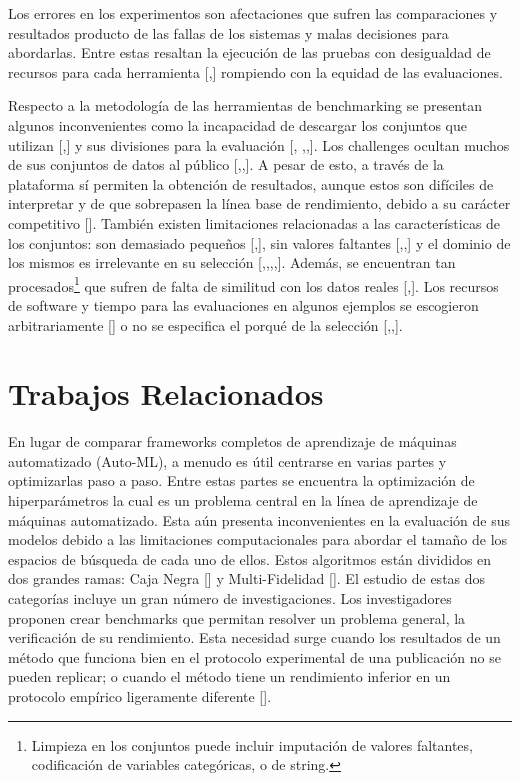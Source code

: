 Los errores en los experimentos son afectaciones que sufren las comparaciones y resultados producto de las fallas de los sistemas y malas decisiones para abordarlas. 
Entre estas resaltan la ejecución de las pruebas con desigualdad de recursos para cada herramienta [\cite{10},\cite{25}] rompiendo con la equidad de las evaluaciones.

Respecto a la metodología de las herramientas de benchmarking se presentan algunos inconvenientes como la incapacidad de descargar los conjuntos que utilizan [\cite{14},\cite{32}] y 
sus divisiones para la evaluación [\cite{10}, \cite{14},\cite{16},\cite{34}]. Los challenges ocultan muchos de sus conjuntos de datos 
al público [\cite{11},\cite{12},\cite{29}]. A pesar de esto, a través de la plataforma sí permiten la obtención de resultados, aunque estos son difíciles de interpretar y de que sobrepasen la línea 
base de rendimiento, debido a su carácter competitivo [\cite{31}]. También existen limitaciones relacionadas a las características de los conjuntos: son demasiado pequeños 
[\cite{15},\cite{23}], sin valores faltantes [\cite{25},\cite{18},\cite{24}] y el dominio de los mismos es irrelevante en su selección 
[\cite{10},\cite{31},\cite{16},\cite{18},\cite{22}]. Además, se encuentran tan procesados\footnote{Limpieza en los conjuntos puede incluir imputación de valores 
faltantes, codificación de variables categóricas, o de string.} que sufren de falta de similitud con los datos reales [\cite{18},\cite{22}]. Los recursos de software y 
tiempo para las evaluaciones en algunos ejemplos se escogieron arbitrariamente [\cite{8}] o no se especifica el porqué de la selección [\cite{13},\cite{24},\cite{22}].

\section{Trabajos Relacionados}\label{section:trabajos_relacionados}


En lugar de comparar frameworks completos de aprendizaje de máquinas automatizado (Auto-ML), a menudo es útil centrarse en varias partes y optimizarlas paso a paso.
Entre estas partes se encuentra la optimización de hiperparámetros la cual es un problema central en la línea de aprendizaje de máquinas automatizado. Esta aún presenta 
inconvenientes en la evaluación de sus modelos debido a las limitaciones computacionales para abordar el tamaño de los espacios de búsqueda de cada uno de ellos. Estos 
algoritmos están divididos en dos grandes ramas: Caja Negra [\cite{35}] y Multi-Fidelidad [\cite{35}]. El estudio de estas dos categorías incluye un gran número de investigaciones. 
Los investigadores proponen crear benchmarks que permitan resolver un problema general, la verificación de su rendimiento. Esta necesidad surge cuando los resultados de 
un método que funciona bien en el protocolo experimental de una publicación no se pueden replicar; o cuando el método tiene un rendimiento inferior en un protocolo 
empírico ligeramente diferente [\cite{61}]. 

